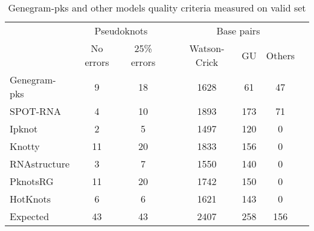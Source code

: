 \begin{table}[h!]
\centering
\caption{Genegram-pks and other models quality criteria measured on valid set}
\begin{tabular}{@{}lccccccc@{}}\toprule
& \multicolumn{2}{c}{Pseudoknots} & \phantom{abc}& \multicolumn{3}{c}{Base pairs} \\
& No errors & 25\% errors  && Watson-Crick & GU & Others \\ \cmidrule{2-3} \cmidrule{5-7} 
Genegram-pks  & 9 & 18 && 1628 & 61 & 47 \\
SPOT-RNA & 4 & 10 && 1893 & 173 & 71 \\
Ipknot & 2 & 5 && 1497 & 120 & 0 \\
Knotty & 11 & 20 && 1833 & 156 & 0 \\
RNAstructure & 3 & 7 && 1550 & 140 & 0 \\
PknotsRG & 11 & 20 && 1742 & 150 & 0 \\
HotKnots & 6 & 6 && 1621 & 143 & 0 \\
\bottomrule
Expected & 43 & 43 && 2407 & 258 & 156 \\
\bottomrule
\end{tabular}
\label{table_pks}
\end{table}